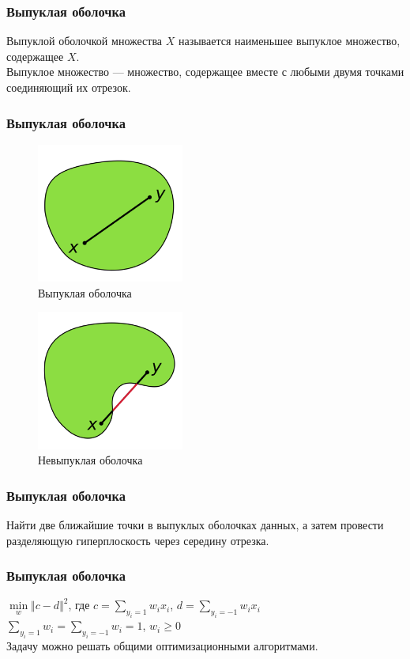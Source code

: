 \documentclass[12pt]{beamer}
\begin{document}
\begin{frame}\frametitle{Выпуклая оболочка}
Выпуклой оболочкой множества $X$ называется наименьшее выпуклое множество, содержащее $X$.\\
\vspace{5mm}
Выпуклое множество — множество, содержащее вместе с любыми двумя точками соединяющий их отрезок.
\end{frame}

\begin{frame}\frametitle{Выпуклая оболочка}
\begin{figure}[htbp]
	\begin{minipage}{.5\textwidth}
	  \includegraphics[height=130pt, keepaspectratio = true]{images/convex} \\
	  \centering Выпуклая оболочка
    \end{minipage}%
    \begin{minipage}{.5\textwidth}
		\includegraphics[height=130pt, keepaspectratio = true]{images/non-convex}   \\
		\centering Невыпуклая оболочка
	\end{minipage}%
\end{figure}
\end{frame}

\begin{frame}\frametitle{Выпуклая оболочка}
Найти две ближайшие точки в выпуклых
оболочках данных, а затем провести разделяющую
гиперплоскость через середину отрезка.
\end{frame}

\begin{frame}\frametitle{Выпуклая оболочка}
$\min\limits_w \Vert c - d \Vert^2$, где $c = \sum\limits_{y_i = 1} w_ix_i$,  $d = \sum\limits_{y_i = -1} w_ix_i$\\
\vspace{5mm}
$\sum\limits_{y_i = 1}w_i = \sum\limits_{y_i = -1}w_i = 1$, $w_i \geq 0$\\
\vspace{5mm}
Задачу можно решать общими оптимизационными алгоритмами.
\end{frame}
\end{document}
